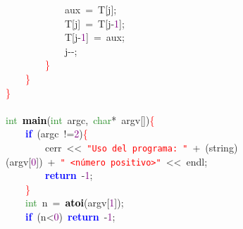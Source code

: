 \mbox{}\ \ \ \ \ \ \ \ \ \ \ \ aux\ \textcolor{BrickRed}{=}\ T\textcolor{BrickRed}{[}j\textcolor{BrickRed}{];} \\
\mbox{}\ \ \ \ \ \ \ \ \ \ \ \ T\textcolor{BrickRed}{[}j\textcolor{BrickRed}{]}\ \textcolor{BrickRed}{=}\ T\textcolor{BrickRed}{[}j\textcolor{BrickRed}{-}\textcolor{Purple}{1}\textcolor{BrickRed}{];} \\
\mbox{}\ \ \ \ \ \ \ \ \ \ \ \ T\textcolor{BrickRed}{[}j\textcolor{BrickRed}{-}\textcolor{Purple}{1}\textcolor{BrickRed}{]}\ \textcolor{BrickRed}{=}\ aux\textcolor{BrickRed}{;} \\
\mbox{}\ \ \ \ \ \ \ \ \ \ \ \ j\textcolor{BrickRed}{-\/-;} \\
\mbox{}\ \ \ \ \ \ \ \ \textcolor{Red}{\}} \\
\mbox{}\ \ \ \ \textcolor{Red}{\}} \\
\mbox{}\textcolor{Red}{\}} \\
\mbox{} \\
\mbox{}\textcolor{ForestGreen}{int}\ \textbf{\textcolor{Black}{main}}\textcolor{BrickRed}{(}\textcolor{ForestGreen}{int}\ argc\textcolor{BrickRed}{,}\ \textcolor{ForestGreen}{char}\textcolor{BrickRed}{*}\ argv\textcolor{BrickRed}{[])}\textcolor{Red}{\{} \\
\mbox{}\ \ \ \ \textbf{\textcolor{Blue}{if}}\ \textcolor{BrickRed}{(}argc\ \textcolor{BrickRed}{!=}\textcolor{Purple}{2}\textcolor{BrickRed}{)}\textcolor{Red}{\{} \\
\mbox{}\ \ \ \ \ \ \ \ cerr\ \textcolor{BrickRed}{\textless{}\textless{}}\ \texttt{\textcolor{Red}{"{}Uso\ del\ programa:\ "{}}}\ \textcolor{BrickRed}{+}\ \textcolor{BrickRed}{(}string\textcolor{BrickRed}{)(}argv\textcolor{BrickRed}{[}\textcolor{Purple}{0}\textcolor{BrickRed}{])}\ \textcolor{BrickRed}{+}\ \texttt{\textcolor{Red}{"{}\ \textless{}número\ positivo\textgreater{}"{}}}\ \textcolor{BrickRed}{\textless{}\textless{}}\ endl\textcolor{BrickRed}{;}\ \  \\
\mbox{}\ \ \ \ \ \ \ \ \textbf{\textcolor{Blue}{return}}\ \textcolor{BrickRed}{-}\textcolor{Purple}{1}\textcolor{BrickRed}{;} \\
\mbox{}\ \ \ \ \textcolor{Red}{\}} \\
\mbox{}\ \ \ \ \textcolor{ForestGreen}{int}\ n\ \textcolor{BrickRed}{=}\ \textbf{\textcolor{Black}{atoi}}\textcolor{BrickRed}{(}argv\textcolor{BrickRed}{[}\textcolor{Purple}{1}\textcolor{BrickRed}{]);}\ \ \ \  \\
\mbox{}\ \ \ \ \textbf{\textcolor{Blue}{if}}\ \textcolor{BrickRed}{(}n\textcolor{BrickRed}{\textless{}}\textcolor{Purple}{0}\textcolor{BrickRed}{)}\ \textbf{\textcolor{Blue}{return}}\ \textcolor{BrickRed}{-}\textcolor{Purple}{1}\textcolor{BrickRed}{;} \\
